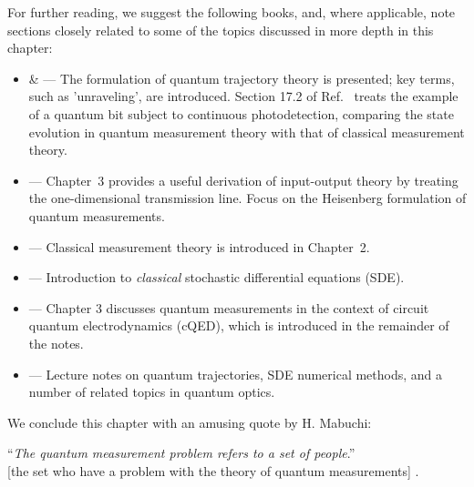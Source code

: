 For further reading, we suggest the following books, and, where applicable,
note sections closely related to some of the topics discussed in more
depth in this chapter:
\begin{itemize}
\item \citet{Carmichael1993} \& \citet{Carmichael2008-Book2} —  The formulation
of quantum trajectory theory is presented; key terms, such as 'unraveling',
are introduced. Section 17.2 of Ref.~\citet{Carmichael2008-Book2}
treats the example of a quantum bit subject to continuous photodetection,
comparing the state evolution in quantum measurement theory with that
of classical measurement theory. 
\item \citet{Gardiner2004} — Chapter~3 provides a useful derivation of
input-output theory by treating the one-dimensional transmission line.
Focus on the Heisenberg formulation of quantum measurements. 
\item \citet{wiseman2010book} — Classical measurement theory is introduced
in Chapter~2. 
\item \citet{Jacobs2010Book} — Introduction to \emph{classical} stochastic
differential equations (SDE).  
\item \citet{Girvin2014} — Chapter 3 discusses  quantum measurements
in the context of circuit quantum electrodynamics (cQED), which is
introduced in the remainder of the notes.
\item \citet{SteckQuantumNotes} — Lecture notes on quantum trajectories,
SDE numerical methods, and a number of related topics in quantum optics. 
\end{itemize}
We conclude this chapter with an amusing quote by H. Mabuchi:
\begin{center}
``\emph{The quantum measurement problem refers to a set of people}.''\\{[}the
set who have a problem with the theory of quantum measurements{]}
\citep{Fuchs2003-qminfo}.
\par\end{center}

